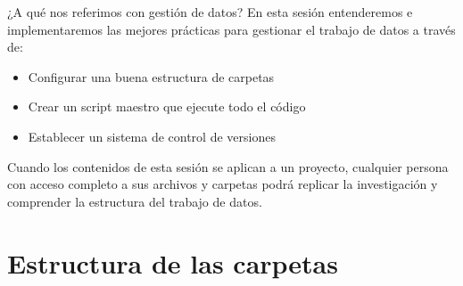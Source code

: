 \documentclass[11pt, aspectratio=169, compress]{beamer}
\begin{document}
\begin{frame}{¿A qué nos referimos con gestión de datos?}
	En esta sesión entenderemos e implementaremos las mejores prácticas para gestionar el trabajo de datos a través de:
	\begin{itemize}
		\item Configurar una buena estructura de carpetas
		\item Crear un script maestro que ejecute todo el código
		\item Establecer un sistema de control de versiones
	\end{itemize}
	Cuando los contenidos de esta sesión se aplican a un proyecto, cualquier persona con acceso completo a sus archivos y carpetas  podrá replicar la investigación y comprender la estructura del trabajo de datos.
\end{frame}
\section{Estructura de las carpetas}
\end{document}
